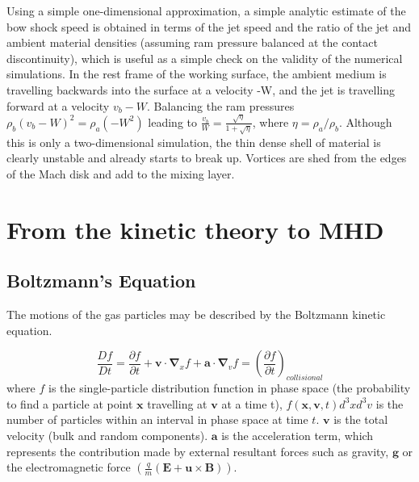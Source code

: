 Using a simple one-dimensional approximation, a simple analytic estimate of the bow shock speed is obtained in terms of the jet speed and the ratio of the jet and ambient material densities (assuming ram pressure balanced at the contact discontinuity), which is useful as a simple check on the validity of the numerical simulations.
In the rest frame of the working surface, the ambient medium is
travelling backwards into the surface at a velocity -W, and the jet is
travelling forward at a velocity $v_b-W$. Balancing the ram pressures ${\rho}_b
{(v_b-W)}^2 = {\rho}_a\left( {-W}^2\right)$ leading to $ \frac{v_b}{W}=\frac{\sqrt{\eta}}{1+\sqrt{\eta}} $, where $\eta={\rho}_a/{\rho}_b$.
Although this is only a two-dimensional simulation, the thin dense shell of material is clearly unstable and already starts to break up. 
Vortices are shed from the edges of the Mach disk and add to the mixing layer.


\section{From the kinetic theory to MHD}
\subsection{Boltzmann's Equation}
The motions of the gas particles may be described by the Boltzmann kinetic equation.

\begin{equation}
\frac{D{f}}{D{t}}=
\frac{\partial{f}}{\partial{t}}
+
\mathbf{v}
\cdot
{\boldsymbol{\nabla}}_x f
+
\mathbf{a}
\cdot
{\boldsymbol{\nabla}}_v f
=
\left( \frac{\partial{f}}{\partial{t}} \right)_{collisional}
\end{equation}
where $f$ is the single-particle distribution function in phase space (the probability to find a particle at point $\mathbf{x}$ travelling at $\mathbf{v}$ at a time t), $f(\mathbf{x},\mathbf{v},t)d^{3}x d^{3}v$ is the number of particles within an interval in phase space at time $t$.
$\mathbf{v}$ is the total velocity (bulk and random components).
$\mathbf{a}$ is the acceleration term, which represents the contribution made by external resultant forces such as gravity, $\mathbf{g}$ or the electromagnetic force $\left(\frac{q}{m} \left( \mathbf{E + u \times B}\right)  \right)$.  


